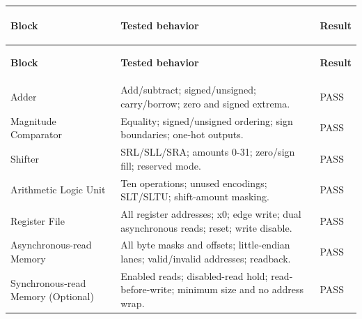 \documentclass[11pt,a4paper]{article}
\newlength{\ReportTableWidth}
\begin{document}
{\small\setlength{\tabcolsep}{4pt}\setlength{\ReportTableWidth}{\linewidth}
\noindent\begin{longtable}{|>{\raggedright\arraybackslash}p{\dimexpr 0.25\ReportTableWidth-2\tabcolsep-2\arrayrulewidth\relax}|>{\raggedright\arraybackslash}p{\dimexpr 0.63\ReportTableWidth-2\tabcolsep-2\arrayrulewidth\relax}|>{\raggedright\arraybackslash}p{\dimexpr 0.12\ReportTableWidth-2\tabcolsep-2\arrayrulewidth\relax}|}
\hline
\colorbox{tablegray}{\parbox[t]{\dimexpr 0.25\ReportTableWidth-2\tabcolsep-2\arrayrulewidth-2\fboxsep\relax}{\strut\textbf{Block}\strut}} & \colorbox{tablegray}{\parbox[t]{\dimexpr 0.63\ReportTableWidth-2\tabcolsep-2\arrayrulewidth-2\fboxsep\relax}{\strut\textbf{Tested behavior}\strut}} & \colorbox{tablegray}{\parbox[t]{\dimexpr 0.12\ReportTableWidth-2\tabcolsep-2\arrayrulewidth-2\fboxsep\relax}{\strut\textbf{Result}\strut}} \\ \hline
\endfirsthead
\hline
\colorbox{tablegray}{\parbox[t]{\dimexpr 0.25\ReportTableWidth-2\tabcolsep-2\arrayrulewidth-2\fboxsep\relax}{\strut\textbf{Block}\strut}} & \colorbox{tablegray}{\parbox[t]{\dimexpr 0.63\ReportTableWidth-2\tabcolsep-2\arrayrulewidth-2\fboxsep\relax}{\strut\textbf{Tested behavior}\strut}} & \colorbox{tablegray}{\parbox[t]{\dimexpr 0.12\ReportTableWidth-2\tabcolsep-2\arrayrulewidth-2\fboxsep\relax}{\strut\textbf{Result}\strut}} \\ \hline
\endhead
Adder & Add/\allowbreak{}subtract; signed/\allowbreak{}unsigned; carry/\allowbreak{}borrow; zero and signed extrema. & PASS \\ \hline
Magnitude Comparator & Equality; signed/\allowbreak{}unsigned ordering; sign boundaries; one-hot outputs. & PASS \\ \hline
Shifter & SRL/\allowbreak{}SLL/\allowbreak{}SRA; amounts 0-31; zero/\allowbreak{}sign fill; reserved mode. & PASS \\ \hline
Arithmetic Logic Unit & Ten operations; unused encodings; SLT/\allowbreak{}SLTU; shift-amount masking. & PASS \\ \hline
Register File & All register addresses; x0; edge write; dual asynchronous reads; reset; write disable. & PASS \\ \hline
Asynchronous-read Memory & All byte masks and offsets; little-endian lanes; valid/\allowbreak{}invalid addresses; readback. & PASS \\ \hline
Synchronous-read Memory (Optional) & Enabled reads; disabled-read hold; read-before-write; minimum size and no address wrap. & PASS \\ \hline
\end{longtable}
}
\end{document}
